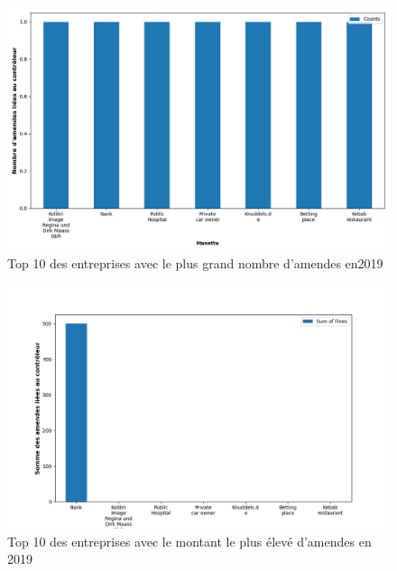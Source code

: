\documentclass[french]{article}
\begin{document}
	
	\begin{multicols}{2}
	\begin{figure}
		[H]\centering\includegraphics[width=1.0\linewidth]{graphs/top10_controller_year}
		\caption{Top 10 des entreprises avec le plus grand nombre d'amendes en2019}
	\end{figure}
	\begin{figure}
		[H]\centering\includegraphics[width=1\linewidth]{graphs/top10_controller_year_fines}
		\caption{Top 10 des entreprises avec le montant le plus élevé d'amendes en 2019}
	 \end{figure}
	
	\end{multicols}
\end{document}
